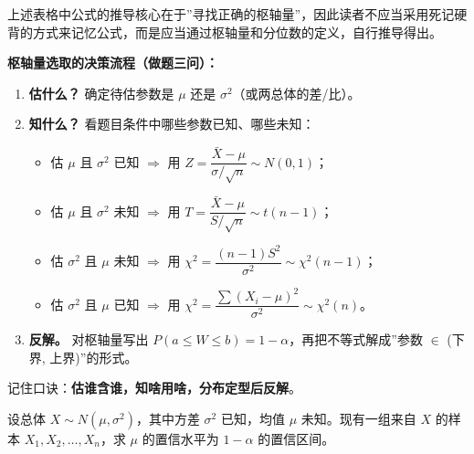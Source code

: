 ﻿\documentclass[lang=cn,11pt]{elegantbook}
\begin{document}
\begin{remark}
上述表格中公式的推导核心在于”寻找正确的枢轴量”，因此读者不应当采用死记硬背的方式来记忆公式，而是应当通过枢轴量和分位数的定义，自行推导得出。
\end{remark}

\begin{note}
\textbf{枢轴量选取的决策流程（做题三问）：}
\begin{enumerate}
    \item \textbf{估什么？} 确定待估参数是 $\mu$ 还是 $\sigma^2$（或两总体的差/比）。
    \item \textbf{知什么？} 看题目条件中哪些参数已知、哪些未知：
    \begin{itemize}
        \item 估 $\mu$ 且 $\sigma^2$ 已知 $\Longrightarrow$ 用 $Z=\dfrac{\bar X-\mu}{\sigma/\sqrt{n}}\sim N(0,1)$；
        \item 估 $\mu$ 且 $\sigma^2$ 未知 $\Longrightarrow$ 用 $T=\dfrac{\bar X-\mu}{S/\sqrt{n}}\sim t(n-1)$；
        \item 估 $\sigma^2$ 且 $\mu$ 未知 $\Longrightarrow$ 用 $\chi^2=\dfrac{(n-1)S^2}{\sigma^2}\sim\chi^2(n-1)$；
        \item 估 $\sigma^2$ 且 $\mu$ 已知 $\Longrightarrow$ 用 $\chi^2=\dfrac{\sum(X_i-\mu)^2}{\sigma^2}\sim\chi^2(n)$。
    \end{itemize}
    \item \textbf{反解。} 对枢轴量写出 $P(a\le W\le b)=1-\alpha$，再把不等式解成”参数 $\in$ (下界, 上界)”的形式。
\end{enumerate}
记住口诀：\textbf{估谁含谁，知啥用啥，分布定型后反解}。
\end{note}

\begin{exercise}[正态总体均值的区间估计] \label{ex:pivotal_quantity}
设总体 $X\sim N(\mu,\sigma^2)$，其中方差 $\sigma^2$ 已知，均值 $\mu$ 未知。现有一组来自 $X$ 的样本 $X_1,X_2,\dots,X_n$，求 $\mu$ 的置信水平为 $1-\alpha$ 的置信区间。
\end{exercise}
\end{document}

